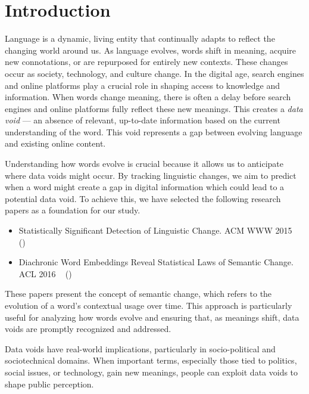 
\section{Introduction} \label{sec:introduction}
Language is a dynamic, living entity that continually adapts to reflect the changing world around us.
As language evolves, words shift in meaning, acquire new connotations, or are repurposed for entirely new contexts.
These changes occur as society, technology, and culture change.
In the digital age, search engines and online platforms play a crucial role in shaping access to knowledge and information.
When words change meaning, there is often a delay before search engines and online platforms fully reflect these new meanings.
This creates a \emph{data void} — an absence of relevant, up-to-date information based on the current understanding of the word.
This void represents a gap between evolving language and existing online content.

Understanding how words evolve is crucial because it allows us to anticipate where data voids might occur.
By tracking linguistic changes, we aim to predict when a word might create a gap in digital information which could lead to a potential data void.
To achieve this, we have selected the following research papers as a foundation for our study.

\begin{itemize}
    \item Statistically Significant Detection of Linguistic Change.
    ACM WWW 2015 ~\cite{kulkarni2014statisticallysignificantdetectionlinguistic} ()
    \item Diachronic Word Embeddings Reveal Statistical Laws of Semantic Change.
    ACL 2016 ~\cite{hamilton-etal-2016-diachronic} ()
\end{itemize}

These papers present the concept of semantic change, which refers to the evolution of a word’s contextual usage over time.
This approach is particularly useful for analyzing how words evolve and ensuring that, as meanings shift, data voids are promptly recognized and addressed.

Data voids have real-world implications, particularly in socio-political and sociotechnical domains.
When important terms, especially those tied to politics, social issues, or technology, gain new meanings,
people can exploit data voids to shape public perception.

